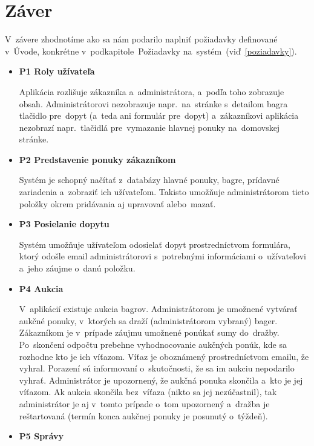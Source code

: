 \chapter*{Záver}

V~závere zhodnotíme ako sa nám podarilo naplniť požiadavky definované v~Úvode, konkrétne v~podkapitole~Požiadavky na~systém~(viď~\ref{poziadavky}).

\begin{itemize}
\item \textbf{P1 Roly užívateľa}

Aplikácia rozlišuje zákazníka a~administrátora, a~podľa toho zobrazuje obsah. Administrátorovi nezobrazuje napr.~na~stránke s~detailom bagra tlačidlo pre~dopyt (a~teda ani formulár pre~dopyt) a~zákazníkovi aplikácia nezobrazí napr.~tlačidlá pre~vymazanie hlavnej ponuky na~domovskej stránke.

\item \textbf{P2 Predstavenie ponuky zákazníkom}

Systém je schopný načítať z~databázy hlavné ponuky, bagre, prídavné zariadenia a~zobraziť ich užívateľom. Takisto umožňuje administrátorom tieto položky okrem pridávania aj upravovať alebo~mazať.

\item \textbf{P3 Posielanie dopytu}

Systém umožňuje užívateľom odosielať dopyt prostredníctvom formulára, ktorý odošle email administrátorovi s~potrebnými informáciami o~užívateľovi a~jeho záujme o~danú položku.

\item \textbf{P4 Aukcia}

V~aplikácií existuje aukcia bagrov. Administrátorom je umožnené vytvárať aukčné ponuky, v~ktorých sa draží (administrátorom vybraný) bager. Zákazníkom je v~prípade záujmu umožnené ponúkať sumy do~dražby. Po~skončení odpočtu prebehne vyhodnocovanie aukčných ponúk, kde sa rozhodne kto je ich víťazom. Víťaz je oboznámený prostredníctvom emailu, že vyhral. Porazení sú informovaní o~skutočnosti, že sa im aukciu nepodarilo vyhrať. Administrátor je upozornený, že aukčná ponuka skončila a~kto je jej víťazom. Ak aukcia skončila bez~víťaza (nikto sa jej nezúčastnil), tak administrátor je aj v~tomto prípade o~tom upozornený a~dražba je reštartovaná (termín konca aukčnej ponuky je posunutý o~týždeň).

\item \textbf{P5 Správy}


\end{itemize}
